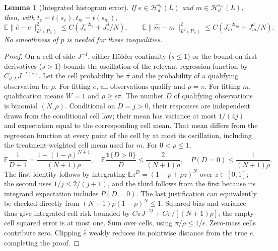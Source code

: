 \documentclass[11pt]{article}
\newtheorem{lemma}[theorem]{Lemma}
\theoremstyle{remark}
\newcommand{\E}{\mathbb E}
\newcommand{\Ind}{\mathbf 1}
\begin{document}
\begin{lemma}[Integrated histogram error]
If $e\in\mathcal H_d^{s_e}(L)$ and
$m\in\mathcal H_d^{s_m}(L)$, then, with $t_e=t(s_e),t_m=t(s_m)$,
\[
 \E\|\widehat e-e\|_{L^2(P_X)}^2
 \leq C(J_e^{-2t_e}+J_e^d/N),\qquad
 \E\|\widehat m-m\|_{L^2(P_X)}^2
 \leq C(J_m^{-2t_m}+J_m^d/N).
\]
No smoothness of $p$ is needed for these inequalities.
\end{lemma}
\begin{proof}
On a cell of side $J^{-1}$, either H\"older continuity ($s\leq1$)
or the bound on first derivatives ($s>1$) bounds the oscillation of
the relevant regression function by $C_{d,L}J^{-t(s)}$.
Let the cell probability be $\pi$ and the probability of a qualifying
observation be $\rho$. For fitting $e$, all observations qualify and
$\rho=\pi$. For fitting $m$, qualification means $W=1$ and
$\rho\geq\epsilon\pi$. The number $D$ of qualifying observations is
binomial $(N,\rho)$. Conditional on $D=j>0$, their responses are
independent draws from the conditional cell law; their mean has variance
at most $1/(4j)$ and expectation equal to the corresponding cell mean.
That mean differs from the regression function at every point of the
cell by at most its oscillation, including the treatment-weighted cell
mean used for $m$.
For $0<\rho\leq1$,
\[
 \E\frac1{D+1}=\frac{1-(1-\rho)^{N+1}}{(N+1)\rho},\quad
 \E\frac{\Ind\{D>0\}}D\leq\frac2{(N+1)\rho},\quad
 P(D=0)\leq\frac1{(N+1)\rho}.
\]
The first identity follows by integrating
$\E z^D=(1-\rho+\rho z)^N$ over $z\in[0,1]$;
the second uses $1/j\leq2/(j+1)$, and the third follows from
the first because its integrand expectation includes $P(D=0)$.
The last justification can equivalently be checked directly from
$(N+1)\rho(1-\rho)^N\leq1$.
Squared bias and variance thus give integrated cell risk bounded by
$C\pi J^{-2t}+C\pi/[(N+1)\rho]$; the empty-cell squared error is
at most one. Sum over cells, using $\pi/\rho\leq1/\epsilon$.
Zero-mass cells contribute zero. Clipping $\widehat e$ weakly reduces
its pointwise distance from the true $e$, completing the proof.
\end{proof}
\end{document}
